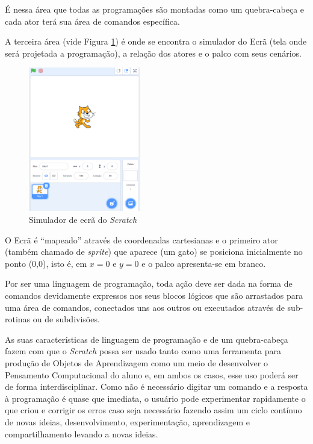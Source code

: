\documentclass[12pt, openright, a4paper, brazil, english, french, spanish, bibjustif, openany, oneside]{abntex2}
\begin{document}
É nessa área que todas as programações são montadas como um quebra-cabeça e cada ator terá sua área de comandos específica.


A terceira área (vide Figura \ref{scr4}) é onde se encontra o simulador do Ecrã (tela onde será projetada a programação), a relação dos atores e o palco com seus cenários.

\begin{figure}[H]

    \center
    \caption{Simulador de ecrã do \textit{Scratch} \label{scr4}}
    \includegraphics[height=6.3cm]{scratch4.png}
    
\end{figure}

O Ecrã é ``mapeado'' através de coordenadas cartesianas e o primeiro ator (também chamado de \textit{sprite}) que aparece (um gato) se posiciona inicialmente no ponto (0,0), isto é, em $x=0$ e $y=0$ e o palco apresenta-se em branco.


Por ser uma linguagem de programação, toda ação deve ser dada na forma de comandos devidamente expressos nos seus blocos lógicos que são arrastados para uma área de comandos, conectados uns aos outros ou executados através de sub-rotinas ou de subdivisões. 


 
 As suas características de linguagem de programação e de um quebra-cabeça fazem com que o \textit{Scratch} possa ser usado tanto como uma ferramenta para produção de Objetos de Aprendizagem como um meio de desenvolver o Pensamento Computacional do aluno e, em ambos os casos, esse uso poderá ser de forma interdisciplinar. Como não é necessário digitar um comando e a resposta à programação é quase que imediata, o usuário pode experimentar rapidamente o que criou e corrigir os erros caso seja necessário fazendo assim um ciclo contínuo de novas ideias, desenvolvimento, experimentação, aprendizagem e compartilhamento levando a novas ideias. 
\end{document}
